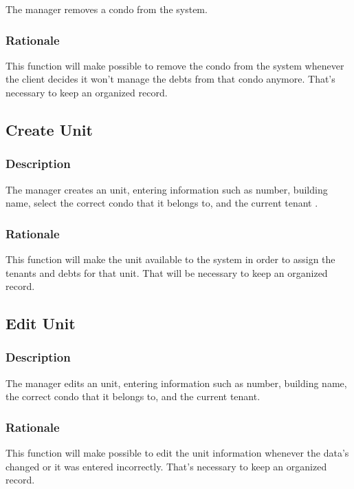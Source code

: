 \documentclass{scrreprt}
\begin{document}
The manager removes a condo from the system.

\subsubsection{Rationale}

This function will make possible to remove the condo from the system whenever the client decides it won't manage the debts from that condo anymore. That's necessary to keep an organized record.

\subsection{Create Unit}
\subsubsection{Description}

The manager creates an unit, entering information such as number, building name, select the correct condo that it belongs to, and the current tenant .

\subsubsection{Rationale}

This function will make the unit available to the system in order to assign the tenants and debts for that unit. That will be necessary to keep an organized record.

\subsection{Edit Unit}
\subsubsection{Description}

The manager edits an unit, entering information such as number, building name, the correct condo that it belongs to, and the current tenant.

\subsubsection{Rationale}

This function will make possible to edit the unit information whenever the data's changed or it was entered incorrectly. That's necessary to keep an organized record.
\end{document}
